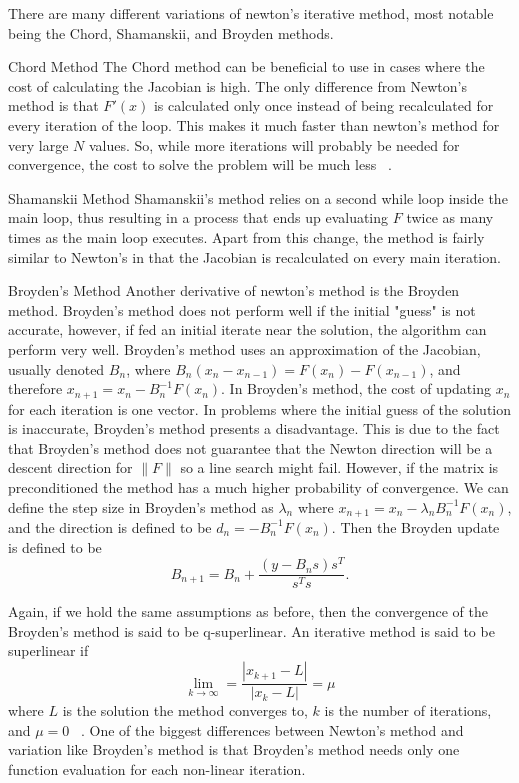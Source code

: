 \documentclass[paper=a4, fontsize=11pt]{scrartcl} %
\numberwithin{equation}{section} %
\numberwithin{figure}{section} %
\numberwithin{table}{section} %
\begin{document}
There are many different variations of newton's iterative method, most notable being the Chord, Shamanskii, and Broyden methods.  

\theoremstyle{definition}
\begin{definition}{Chord Method}
The Chord method can be beneficial to use in cases where the cost of calculating the Jacobian is high.  The only difference from Newton's method is that $F'(x)$ is calculated only once instead of being recalculated for every iteration of the loop.  This makes it much faster than newton's method for very large $N$ values.  So, while more iterations will probably be needed for convergence, the cost to solve the problem will be much less ~\cite{online2}.  
\end{definition}

\theoremstyle{definition}
\begin{definition}{Shamanskii Method}
\indent Shamanskii's method relies on a second while loop inside the main loop, thus resulting in a process that  ends up evaluating $F$ twice as many times as the main loop executes.  Apart from this change, the method is fairly similar to Newton's in that the Jacobian is recalculated on every main iteration.  
\end{definition}

\theoremstyle{definition}
\begin{definition}{Broyden's Method}
Another derivative of newton's method is the Broyden method.  Broyden's method does not perform well if the initial "guess" is not accurate, however, if fed an initial iterate near the solution, the algorithm can perform very well.  Broyden's method uses an approximation of the Jacobian, usually denoted $B_n$, where $B_n(x_n-x_{n-1}) = F(x_n) - F(x_{n-1})$, and therefore $x_{n+1} = x_n - B_n^{-1} F(x_n)$.  In Broyden's method, the cost of updating $x_n$ for each iteration is one vector.  In problems where the initial guess of the solution is inaccurate, Broyden's method presents a disadvantage.  This is due to the fact that Broyden's method does not guarantee that the Newton direction will be a descent direction for $\|F\|$ so a line search might fail.  However, if the matrix is preconditioned the method has a much higher probability of convergence.  We can define the step size in Broyden's method as $\lambda_n$ where $x_{n+1} = x_n - \lambda_n B_n^{-1}F(x_n)$, and the direction is defined to be $d_n = -B_n^{-1}F(x_n)$.  Then the Broyden update is defined to be $$B_{n+1} = B_n + \frac{(y-B_ns)s^T}{s^Ts}.$$

Again, if we hold the same assumptions as before, then the convergence of the Broyden's method is said to be q-superlinear.  An iterative method is said to be superlinear if $$\lim_{k \rightarrow \infty} = \frac{|x_{k+1} - L|}{|x_k - L|} = \mu$$ where $L$ is the solution the method converges to, $k$ is the number of iterations, and $\mu = 0$ ~\cite{online2}.  One of the biggest differences between Newton's method and variation like Broyden's method is that Broyden's method needs only one function evaluation for each non-linear iteration.  
\end{definition}
\end{document}
